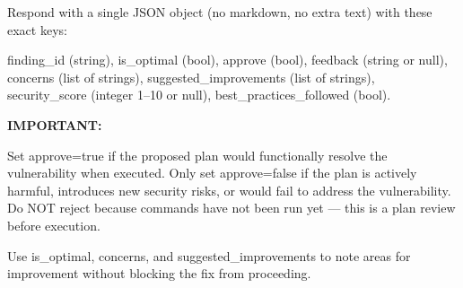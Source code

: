 \documentclass[pdflatex,sn-mathphys-num]{sn-jnl}%
\begin{document}
\begin{appendices}
\begin{promptbox}
Respond with a single JSON object (no markdown, no extra text) with these exact keys:

finding\_id (string), is\_optimal (bool), approve (bool), feedback (string or null), \\
concerns (list of strings), suggested\_improvements (list of strings), \\
security\_score (integer 1--10 or null), best\_practices\_followed (bool).

\textbf{IMPORTANT:}

Set approve=true if the proposed plan would functionally resolve the vulnerability when executed.  
Only set approve=false if the plan is actively harmful, introduces new security risks, or would fail to address the vulnerability.  
Do NOT reject because commands have not been run yet — this is a plan review before execution.

Use is\_optimal, concerns, and suggested\_improvements to note areas for improvement without blocking the fix from proceeding.
\end{promptbox}





\end{appendices}
\end{document}
